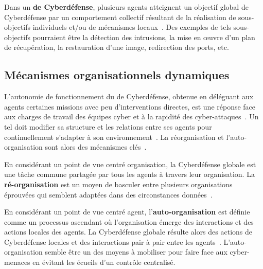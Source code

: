 Dans un \textbf{ de Cyberdéfense}, plusieurs agents atteignent un objectif global de Cyberdéfense par un comportement collectif résultant de la réalisation de sous-objectifs individuels et/ou de mécanismes locaux~\cite{jamont2015meeting}.
Des exemples de tels sous-objectifs pourraient être la détection des intrusions, la mise en œuvre d'un plan de récupération, la restauration d'une image, redirection des ports, etc.

\subsection{Mécanismes organisationnels dynamiques}

L'autonomie de fonctionnement du  de Cyberdéfense, obtenue en déléguant aux agents certaines missions avec peu d'interventions directes, est une réponse face aux charges de travail des équipes cyber et à la rapidité des cyber-attaques~\cite{ieeesp_KottT20}.
Un tel  doit modifier sa structure et les relations entre ses agents pour continuellement s'adapter à son environnement~\cite{theron_autonomous_2021}.
La réorganisation et l'auto-organisation sont alors des mécanismes clés~\cite{picard2009reorganisation}.

En considérant un point de vue centré organisation, la Cyberdéfense globale est une tâche commune partagée par tous les agents à travers leur organisation.
La \textbf{ré-organisation} est un moyen de basculer entre plusieurs organisations éprouvées qui semblent adaptées dans des circonstances données~\cite{picard2009reorganisation}.

En considérant un point de vue centré agent, l'\textbf{auto-organisation} est définie comme un processus ascendant où l'organisation émerge des interactions et des actions locales des agents.
La Cyberdéfense globale résulte alors des actions de Cyberdéfense locales et des interactions pair à pair entre les agents~\cite{picard2009reorganisation}.
L'auto-organisation semble être un des moyens à mobiliser pour faire face aux cyber-menaces en évitant les écueils d'un contrôle centralisé.



